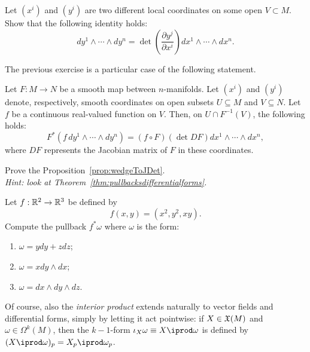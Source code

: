 \begin{exercise}
	Let $(x^i)$ and $(y^i)$ are two different local coordinates on some open $V\subset M$.
	Show that the following identity holds:
	\begin{equation}
		dy^1\wedge\cdots\wedge dy^n = \det\left(\frac{\partial y^j}{\partial x^i}\right) dx^1\wedge\cdots\wedge dx^n.
	\end{equation}
\end{exercise}

The previous exercise is a particular case of the following statement.

\begin{proposition}\label{prop:wedgeToJDet}
	Let $F:M\to N$ be a smooth map between $n$-manifolds.
	Let $(x^i)$ and $(y^i)$ denote, respectively, smooth coordinates on open subsets $U\subseteq M$ and $V\subseteq N$.
	Let $f$ be a continuous real-valued function on $V$.
	Then, on $U\cap F^{-1}(V)$, the following holds:
	\begin{equation}
		F^*(f\, dy^1\wedge\cdots\wedge dy^n)
		= (f\circ F) (\det DF) dx^1\wedge\cdots\wedge dx^n,
	\end{equation}
	where $DF$ represents the Jacobian matrix of $F$ in these coordinates.
\end{proposition}

\begin{exercise}
	Prove the Proposition~\ref{prop:wedgeToJDet}.\\
	\textit{\small Hint: look at Theorem~\ref{thm:pullbacksdifferentialforms}.}
\end{exercise}

\begin{exercise}
	Let $f: \mathbb{R}^2 \to \mathbb{R}^3$ be defined by
	\begin{equation}
		f(x, y) = (x^2, y^2, xy).
	\end{equation}
	Compute the pullback $f^*\omega$ where $\omega$ is the form:
	\begin{enumerate}
		\item $\omega = y dy + z dz$;
		\item $\omega = x dy \wedge dx$;
		\item $\omega = dx \wedge dy\wedge dz$.
	\end{enumerate}
\end{exercise}

Of course, also the \emph{interior product} extends naturally to vector fields and differential forms, simply by letting it act pointwise: if $X\in\mathfrak{X}(M)$ and $\omega\in\Omega^k(M)$, then the $k-1$-form $\iota_X\omega\equiv X\iprod\omega$ is defined by $(X\iprod\omega)_p = X_p \iprod \omega_p$.

